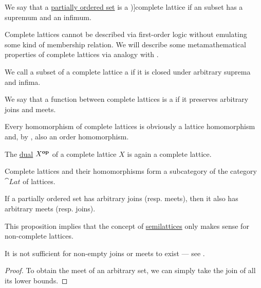 \begin{definition}\label{def:complete_lattice}
  We say that a \hyperref[def:partially_ordered_set]{partially ordered set} is a \term[ru=полная (решётка) (\cite[133]{Гуров2013Решётки})]{complete lattice} if an  subset has a supremum and an infimum.

  Complete lattices cannot be described via first-order logic without emulating some kind of membership relation. We will describe some metamathematical properties of complete lattices via analogy with .
  \begin{thmenum}
     We call a subset of a complete lattice a  if it is closed under arbitrary suprema and infima.

    \mimprovised We say that a function between complete lattices is a  if it preserves arbitrary joins and meets.

    Every homomorphism of complete lattices is obviously a lattice homomorphism and, by , also an order homomorphism.

     The \hyperref[def:preordered_set/opposite]{dual} \( X^\oppos \) of a complete lattice \( X \) is again a complete lattice.

     Complete lattices and their homomorphisms form a subcategory of the category \( \cat{Lat} \) of lattices.
  \end{thmenum}
\end{definition}

\begin{proposition}\label{thm:complete_semilattice}
  If a partially ordered set has arbitrary joins (resp. meets), then it also has arbitrary meets (resp. joins).
\end{proposition}
\begin{comments}
  \item This proposition implies that the concept of \hyperref[def:semilattice]{semilattices} only makes sense for non-complete lattices.

  \item It is not sufficient for non-empty joins or meets to exist --- see .
\end{comments}
\begin{proof}
  To obtain the meet of an arbitrary set, we can simply take the join of all its lower bounds.
\end{proof}

